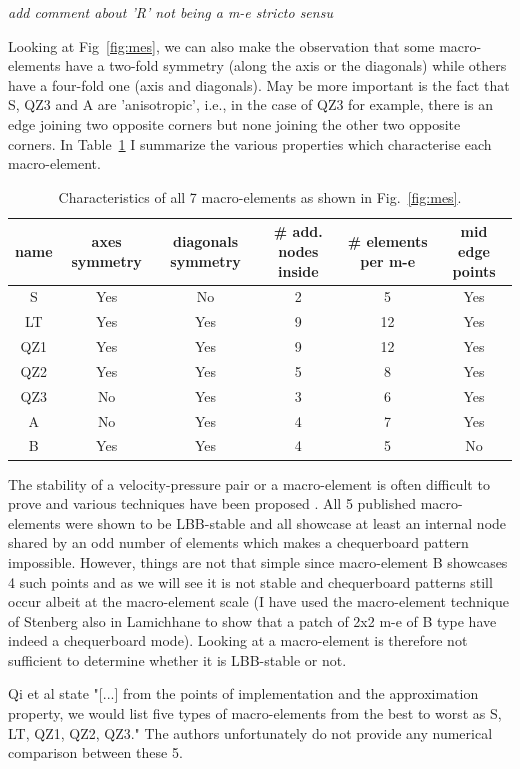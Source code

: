 \documentclass[a4paper]{article}
\begin{document}
{\it add comment about 'R' not being a m-e stricto sensu}

Looking  at Fig~\ref{fig:mes}, we can also make the observation that some macro-elements 
have a two-fold symmetry (along the axis or the diagonals) while others have a four-fold one 
(axis and diagonals). May be more important is the fact that S, QZ3 and A are 'anisotropic', i.e., in 
the case of QZ3 for example, there is an edge joining two opposite corners but none joining the 
other two opposite corners.
In Table~\ref{tab1} I summarize the various properties which characterise each macro-element.

\begin{table}
\centering
\begin{tabular}{cccccc}
\hline
{name} & {axes symmetry}  & {diagonals symmetry} & {\# add. nodes inside} 
& {\# elements per m-e} & {mid edge points}  \\
\hline
\hline
S   &  Yes &   No & 2  & 5 & Yes \\
LT  &  Yes &  Yes & 9 & 12 & Yes \\
QZ1 &  Yes &  Yes & 9 & 12 & Yes \\
QZ2 &  Yes &  Yes & 5 & 8  & Yes \\
QZ3 &  No  &  Yes & 3 & 6  & Yes \\
A   &  No  &  Yes & 4 & 7  & Yes \\
B   &  Yes &  Yes & 4 & 5  & No  \\
\hline
\end{tabular}
\caption{Characteristics of all 7 macro-elements as shown in Fig.~\ref{fig:mes}.\label{tab1}}%
\end{table}


The stability of a velocity-pressure pair or a macro-element is often difficult to prove 
and various techniques have been proposed \cite{bobf13}. 
All 5 published macro-elements were shown to be LBB-stable and all showcase at least 
an internal node shared by an odd number of elements which makes a chequerboard pattern impossible. 
However, things are not that simple since macro-element B showcases 
4 such points and as we will see it is not stable and chequerboard patterns still occur 
albeit at the macro-element scale (I have used the macro-element technique of Stenberg 
also in Lamichhane to show that a patch of 2x2 m-e of B type have indeed a chequerboard mode).
Looking at a macro-element is therefore not sufficient to determine whether it is LBB-stable or not. 

Qi et al \cite{qizh07} state "[...] from the points of implementation and the approximation property, we 
would list five types of macro-elements from the best to worst as S, LT, QZ1, QZ2, QZ3." 
The authors unfortunately do not provide any numerical comparison between these 5. 
\end{document}
